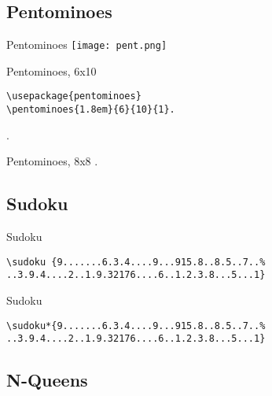 \documentclass[xcolor=svgnames]{beamer}
\begin{document}
\subsection{Pentominoes}

%
\begin{frame}[fragile]{Pentominoes}
  \centering\texttt{[image: pent.png]}
\end{frame}

%
\begin{frame}[fragile]{Pentominoes, 6x10}
\begin{verbatim}
\usepackage{pentominoes}
\pentominoes{1.8em}{6}{10}{1}.
\end{verbatim}  

.

\end{frame}

%
\begin{frame}{Pentominoes, 8x8}
.
\end{frame}


\subsection{Sudoku}

%
\begin{frame}[fragile]{Sudoku}
\begin{verbatim}
\sudoku {9.......6.3.4....9...915.8..8.5..7..%
..3.9.4....2..1.9.32176....6..1.2.3.8...5...1}
\end{verbatim}  
\begin{center}
\end{center}
\end{frame}

%
\begin{frame}[fragile]{Sudoku}
\begin{verbatim}
\sudoku*{9.......6.3.4....9...915.8..8.5..7..%
..3.9.4....2..1.9.32176....6..1.2.3.8...5...1}
\end{verbatim}
\begin{center}
\end{center}
\end{frame}


\subsection{N-Queens}
\end{document}
